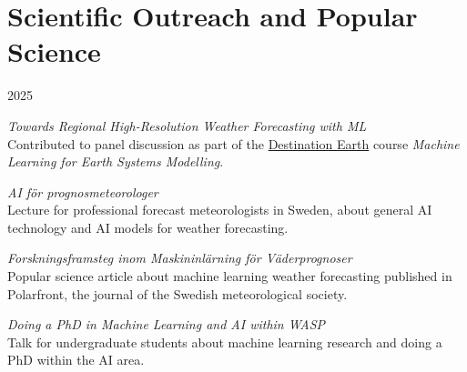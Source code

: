 \section*{Scientific Outreach and Popular Science}
\newcommand{\outreach}[3]{%
    \item [#2] \textit{#1}\\
    #3
}
\begin{labeling}{2025}
    \outreach{Towards Regional High-Resolution Weather Forecasting with ML}{2026}{Contributed to panel discussion as part of the \href{https://destine.ecmwf.int/}{Destination Earth} course \textit{Machine Learning for Earth Systems Modelling}.}
    \outreach{AI för prognosmeteorologer}{2025}{Lecture for professional forecast meteorologists in Sweden, about general AI technology and AI models for weather forecasting.}
    \outreach{Forskningsframsteg inom Maskininlärning för Väderprognoser}{2025}{Popular science article about machine learning weather forecasting published in Polarfront, the journal of the Swedish meteorological society.}
    \outreach{Doing a PhD in Machine Learning and AI within WASP}{2025}{Talk for undergraduate students about machine learning research and doing a PhD within the AI area.}
\end{labeling}


